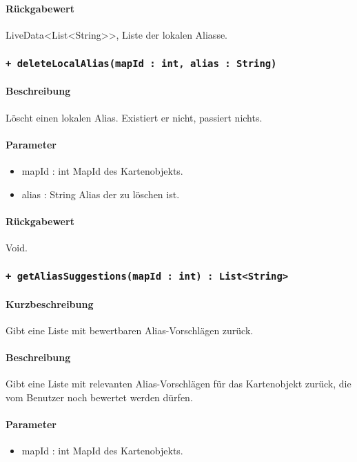 \paragraph*{Rückgabewert}
LiveData<List<String>>, Liste der lokalen Aliasse.

\subsubsection*{\texttt{+ deleteLocalAlias(mapId : int, alias : String)}}%
\paragraph*{Beschreibung}
Löscht einen lokalen Alias. Existiert er nicht, passiert nichts.
\paragraph*{Parameter}
\begin{itemize}
    \item mapId : int MapId des Kartenobjekts.
    \item alias : String Alias der zu löschen ist.
\end{itemize}
\paragraph*{Rückgabewert}
Void.

\subsubsection*{\texttt{+ getAliasSuggestions(mapId : int) : List<String>}}%
\paragraph*{Kurzbeschreibung}
Gibt eine Liste mit bewertbaren Alias-Vorschlägen zurück.
\paragraph*{Beschreibung}
Gibt eine Liste mit relevanten Alias-Vorschlägen für das Kartenobjekt zurück, 
die vom Benutzer noch bewertet werden dürfen.
\paragraph*{Parameter}
\begin{itemize}
    \item mapId : int MapId des Kartenobjekts.
\end{itemize}
